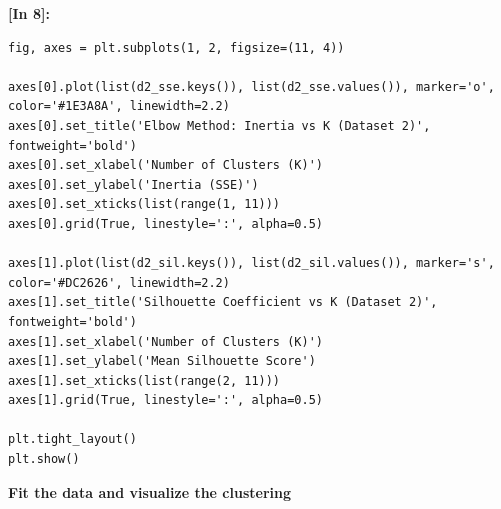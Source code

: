 \vspace{0.4em}
\noindent\textbf{\small [In 8]:}
\begin{lstlisting}[style=pycode]
fig, axes = plt.subplots(1, 2, figsize=(11, 4))

axes[0].plot(list(d2_sse.keys()), list(d2_sse.values()), marker='o', color='#1E3A8A', linewidth=2.2)
axes[0].set_title('Elbow Method: Inertia vs K (Dataset 2)', fontweight='bold')
axes[0].set_xlabel('Number of Clusters (K)')
axes[0].set_ylabel('Inertia (SSE)')
axes[0].set_xticks(list(range(1, 11)))
axes[0].grid(True, linestyle=':', alpha=0.5)

axes[1].plot(list(d2_sil.keys()), list(d2_sil.values()), marker='s', color='#DC2626', linewidth=2.2)
axes[1].set_title('Silhouette Coefficient vs K (Dataset 2)', fontweight='bold')
axes[1].set_xlabel('Number of Clusters (K)')
axes[1].set_ylabel('Mean Silhouette Score')
axes[1].set_xticks(list(range(2, 11)))
axes[1].grid(True, linestyle=':', alpha=0.5)

plt.tight_layout()
plt.show()
\end{lstlisting}

\vspace{0.3em}
\begin{tcolorbox}[colback=gray!5!white,colframe=gray!50!black,boxrule=0.5pt,arc=2pt,left=4pt,right=4pt,top=2pt,bottom=2pt,unbreakable,before upper={\sloppy\raggedright}]
{\small\bfseries Fit the data and visualize the clustering\par}
\end{tcolorbox}

